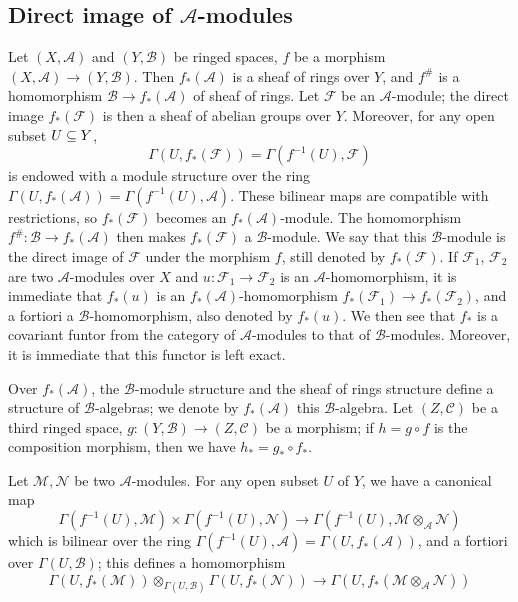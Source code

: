 \subsection{Direct image of \texorpdfstring{$\mathscr{A}$}{A}-modules}
Let $(X,\mathscr{A})$ and $(Y,\mathscr{B})$ be ringed spaces, $f$ be a morphism $(X,\mathscr{A})\to(Y,\mathscr{B})$. Then $f_*(\mathscr{A})$ is a sheaf of rings over $Y$, and $f^{\#}$ is a homomorphism $\mathscr{B}\to f_*(\mathscr{A})$ of sheaf of rings. Let $\mathscr{F}$ be an $\mathscr{A}$-module; the direct image $f_*(\mathscr{F})$ is then a sheaf of abelian groups over $Y$. Moreover, for any open subset $U\subseteq Y$,
\[\Gamma(U,f_*(\mathscr{F}))=\Gamma(f^{-1}(U),\mathscr{F})\]
is endowed with a module structure over the ring $\Gamma(U,f_*(\mathscr{A}))=\Gamma(f^{-1}(U),\mathscr{A})$. These bilinear maps are compatible with restrictions, so $f_*(\mathscr{F})$ becomes an $f_*(\mathscr{A})$-module. The homomorphism $f^{\#}:\mathscr{B}\to f_*(\mathscr{A})$ then makes $f_*(\mathscr{F})$ a $\mathscr{B}$-module. We say that this $\mathscr{B}$-module is the direct image of $\mathscr{F}$ under the morphism $f$, still denoted by $f_*(\mathscr{F})$. If $\mathscr{F}_1$, $\mathscr{F}_2$ are two $\mathscr{A}$-modules over $X$ and $u:\mathscr{F}_1\to\mathscr{F}_2$ is an $\mathscr{A}$-homomorphism, it is immediate that $f_*(u)$ is an $f_*(\mathscr{A})$-homomorphism $f_*(\mathscr{F}_1)\to f_*(\mathscr{F}_2)$, and a fortiori a $\mathscr{B}$-homomorphism, also denoted by $f_*(u)$. We then see that $f_*$ is a covariant funtor from the category of $\mathscr{A}$-modules to that of $\mathscr{B}$-modules. Moreover, it is immediate that this functor is left exact.\par
Over $f_*(\mathscr{A})$, the $\mathscr{B}$-module structure and the sheaf of rings structure define a structure of $\mathscr{B}$-algebras; we denote by $f_*(\mathscr{A})$ this $\mathscr{B}$-algebra. Let $(Z,\mathscr{C})$ be a third ringed space, $g:(Y,\mathscr{B})\to(Z,\mathscr{C})$ be a morphism; if $h=g\circ f$ is the composition morphism, then we have $h_*=g_*\circ f_*$.\par
Let $\mathscr{M},\mathscr{N}$ be two $\mathscr{A}$-modules. For any open subset $U$ of $Y$, we have a canonical map
\[\Gamma(f^{-1}(U),\mathscr{M})\times\Gamma(f^{-1}(U),\mathscr{N})\to\Gamma(f^{-1}(U),\mathscr{M}\otimes_{\mathscr{A}}\mathscr{N})\]
which is bilinear over the ring $\Gamma(f^{-1}(U),\mathscr{A})=\Gamma(U,f_*(\mathscr{A}))$, and a fortiori over $\Gamma(U,\mathscr{B})$; this defines a homomorphism
\[\Gamma(U,f_*(\mathscr{M}))\otimes_{\Gamma(U,\mathscr{B})}\Gamma(U,f_*(\mathscr{N}))\to\Gamma(U,f_*(\mathscr{M}\otimes_{\mathscr{A}}\mathscr{N}))\]

